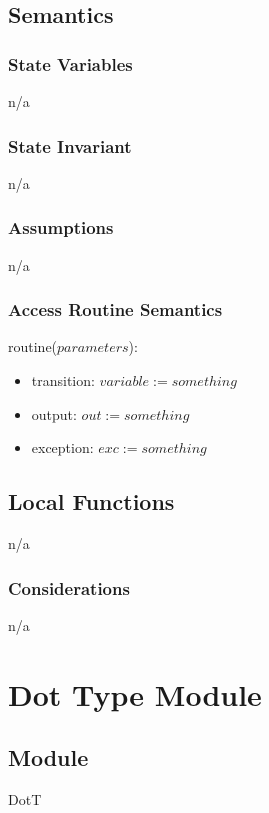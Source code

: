 \documentclass[12pt]{article}
\begin{document}
\subsection* {Semantics}
\subsubsection* {State Variables}
n/a

\subsubsection* {State Invariant}
n/a

\subsubsection* {Assumptions}
n/a

\subsubsection* {Access Routine Semantics}
\noindent routine($parameters$):
\begin{itemize}
    \item transition: $variable := something$
    \item output: $out := something$
    \item exception: $exc := something$
\end{itemize}


\subsection*{Local Functions}
n/a


\subsubsection* {Considerations}
n/a



\newpage
\section* {Dot Type Module}
\subsection*{Module}
DotT
\end{document}

